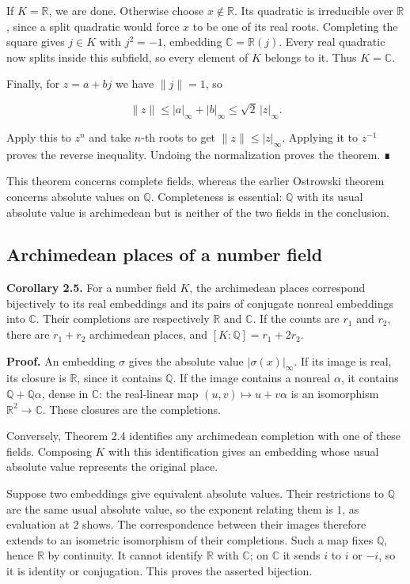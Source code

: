 \documentclass[
  english,
  11pt,
  a4paper,
]{article}
\begin{document}
If \(K=\mathbb R\), we are done. Otherwise choose \(x\notin\mathbb R\).
Its quadratic is irreducible over \(\mathbb R\), since a split quadratic
would force \(x\) to be one of its real roots. Completing the square
gives \(j\in K\) with \(j^2=-1\), embedding \(\mathbb C=\mathbb R(j)\).
Every real quadratic now splits inside this subfield, so every element
of \(K\) belongs to it. Thus \(K=\mathbb C\).

Finally, for \(z=a+bj\) we have \(\|j\|=1\), so

\[\|z\|\le |a|_\infty+|b|_\infty\le\sqrt2\,|z|_\infty.\]

Apply this to \(z^n\) and take \(n\)-th roots to get
\(\|z\|\le|z|_\infty\). Applying it to \(z^{-1}\) proves the reverse
inequality. Undoing the normalization proves the theorem. ∎

This theorem concerns complete fields, whereas the earlier Ostrowski
theorem concerns absolute values on \(\mathbb Q\). Completeness is
essential: \(\mathbb Q\) with its usual absolute value is archimedean
but is neither of the two fields in the conclusion.

\subsection{Archimedean places of a number
field}\label{NT-LOC-02--archimedean-places-of-a-number-field}

\textbf{Corollary 2.5.} For a number field \(K\), the archimedean places
correspond bijectively to its real embeddings and its pairs of conjugate
nonreal embeddings into \(\mathbb C\). Their completions are
respectively \(\mathbb R\) and \(\mathbb C\). If the counts are \(r_1\)
and \(r_2\), there are \(r_1+r_2\) archimedean places, and
\([K:\mathbb Q]=r_1+2r_2\).

\textbf{Proof.} An embedding \(\sigma\) gives the absolute value
\(|\sigma(x)|_\infty\). If its image is real, its closure is
\(\mathbb R\), since it contains \(\mathbb Q\). If the image contains a
nonreal \(\alpha\), it contains \(\mathbb Q+\mathbb Q\alpha\), dense in
\(\mathbb C\): the real-linear map \((u,v)\mapsto u+v\alpha\) is an
isomorphism \(\mathbb R^2\to\mathbb C\). These closures are the
completions.

Conversely, Theorem 2.4 identifies any archimedean completion with one
of these fields. Composing \(K\) with this identification gives an
embedding whose usual absolute value represents the original place.

Suppose two embeddings give equivalent absolute values. Their
restrictions to \(\mathbb Q\) are the same usual absolute value, so the
exponent relating them is \(1\), as evaluation at \(2\) shows. The
correspondence between their images therefore extends to an isometric
isomorphism of their completions. Such a map fixes \(\mathbb Q\), hence
\(\mathbb R\) by continuity. It cannot identify \(\mathbb R\) with
\(\mathbb C\); on \(\mathbb C\) it sends \(i\) to \(i\) or \(-i\), so it
is identity or conjugation. This proves the asserted bijection.
\end{document}
